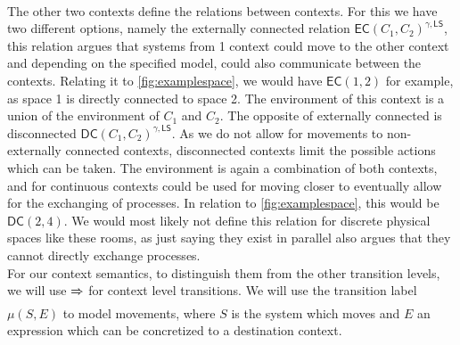 \\
The other two contexts define the relations between contexts. For this we have two different options, namely the externally connected relation $\mathsf{EC}(C_1, C_2)^{\gamma , \mathsf{LS}}$, this relation argues that systems from 1 context could move to the other context and depending on the specified model, could also communicate between the contexts. Relating it to \ref{fig:examplespace}, we would have $\mathsf{EC}(1,2)$  for example, as space 1 is directly connected to space 2. The environment of this context is a union of the environment of $C_1$ and $C_2$. The opposite of externally connected is disconnected $\mathsf{DC}(C_1, C_2)^{\gamma , \mathsf{LS}}$. As we do not allow for movements to non-externally connected contexts, disconnected contexts limit the possible actions which can be taken. The environment is again a combination of both contexts, and for continuous contexts could be used for moving closer to eventually allow for the exchanging of processes. In relation to \ref{fig:examplespace}, this would be $\mathsf{DC}(2,4)$. We would most likely not define this relation for discrete physical spaces like these rooms, as just saying they exist in parallel also argues that they cannot directly exchange processes.
\\
For our context semantics, to distinguish them from the other transition levels, we will use $\xRightarrow[]{}$ for context level transitions. We will use the transition label $\mu (S, E)$ to model movements, where $S$ is the system which moves and $E$ an expression which can be concretized to a destination context.
